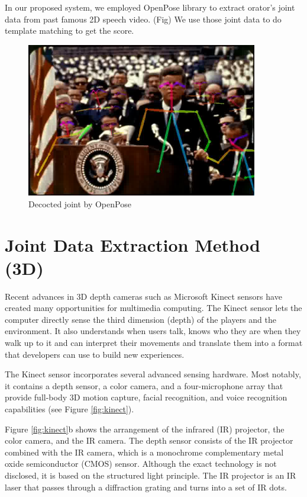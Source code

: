 \par In our proposed system, we employed OpenPose library to extract orator's joint data from past famous 2D speech video. (Fig) We use those joint data to do template matching to get the score.

\begin{figure}[htbp]
  \centering\includegraphics[width=0.9\textwidth]{./img/jfk.png}
\caption{Decocted joint by OpenPose}\label{fig:architecture}
\end{figure}



\section{Joint Data Extraction Method (3D)}
\par Recent advances in 3D depth cameras such as Microsoft Kinect sensors have created many opportunities for multimedia computing. The Kinect sensor lets the computer directly sense the third dimension (depth) of the players and the environment. It also understands when users talk, knows who they are when they walk up to it and can interpret their movements and translate them into a format that developers can use to build new experiences\cite{Zhang2012}.
\par The Kinect sensor incorporates several advanced sensing hardware. Most notably, it contains a depth sensor, a color camera, and a four-microphone array that provide full-body 3D motion capture, facial recognition, and voice recognition capabilities (see Figure \ref{fig:kinect}).
\par Figure \ref{fig:kinect}b shows the arrangement of the infrared (IR) projector, the color camera, and the IR camera. The depth sensor consists of the IR projector combined with the IR camera, which is a monochrome complementary metal oxide semiconductor (CMOS) sensor. Although the exact technology is not disclosed, it is based on the structured light principle. The IR projector is an IR laser that passes through a diffraction grating and turns into a set of IR dots\cite{Zhang2012}. 

